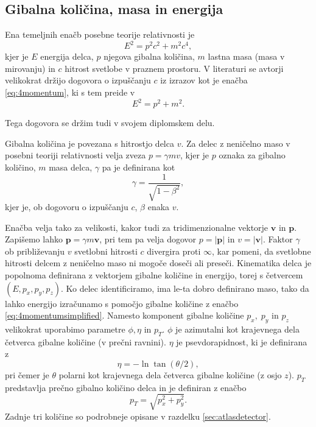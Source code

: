 \documentclass[11pt,a4paper,openany]{book}
\begin{document}
\subsection{Gibalna količina, masa in energija}
Ena temeljnih enačb posebne teorije relativnosti je
\begin{equation}
E^2 = p^2c^2 + m^2c^4,
\label{eq:4momentum}
\end{equation}
kjer je $E$ energija delca, $p$ njegova gibalna količina, $m$ lastna masa (masa v mirovanju) in $c$ hitrost svetlobe v praznem prostoru. V literaturi se avtorji velikokrat držijo dogovora o izpuščanju $c$ iz izrazov kot je enačba \ref{eq:4momentum}, ki s tem preide v 
\begin{equation}
E^2 = p^2 + m^2.
\label{eq:4momentumsimplified}
\end{equation}

\noindent Tega dogovora se držim tudi v svojem diplomskem delu.

Gibalna količina je povezana s hitrostjo delca $v$.  Za delec z neničelno maso v posebni teoriji relativnosti velja zveza $p = \gamma m v$, kjer je $p$ oznaka za gibalno količino, $m$ masa delca, $\gamma$ pa je definirana kot
\begin{equation}
\gamma = \frac{1}{\sqrt{1 - \beta^2}},
\label{eq:gamma}
\end{equation}
kjer je, ob dogovoru o izpuščanju $c$, $\beta$ enaka $v$.

Enačba velja tako za velikosti, kakor tudi za tridimenzionalne vektorje $\mathbf{v}$ in $\mathbf{p}$. Zapišemo lahko $\mathbf{p} = \gamma m \mathbf{v}$, pri tem pa velja dogovor $p = |\mathbf{p}|$ in $v = |\mathbf{v}|$. Faktor $\gamma$ ob približevanju $v$ svetlobni hitrosti $c$ divergira proti $\infty$, kar pomeni, da svetlobne hitrosti delcem z neničelno maso ni mogoče doseči ali preseči. Kinematika delca je popolnoma definirana z vektorjem gibalne količine in energijo, torej s četvercem $(E, p_x, p_y, p_z)$. Ko delec identificiramo, ima le-ta dobro definirano maso, tako da lahko energijo izračunamo s pomočjo gibalne količine z enačbo \ref{eq:4momentumsimplified}. Namesto komponent gibalne količine $p_x,\;p_y$ in $p_z$ velikokrat uporabimo parametre $\phi, \eta$ in $p_T$. $\phi$ je azimutalni kot krajevnega dela četverca gibalne količine (v prečni ravnini). $\eta$ je psevdorapidnost, ki je definirana z
\begin{equation}
\eta = -\ln \tan(\theta/2),
\label{eq:pseudorapidity}
\end{equation}
pri čemer je $\theta$ polarni kot krajevnega dela četverca gibalne količine (z osjo $z$). $p_T$ predstavlja prečno gibalno količino delca in je definiran z enačbo
\begin{equation}
p_T = \sqrt{p_x^2 + p_y^2}.
\label{eq:transversemomentum}
\end{equation}
Zadnje tri količine so podrobneje opisane v razdelku \ref{sec:atlasdetector}.
\end{document}
